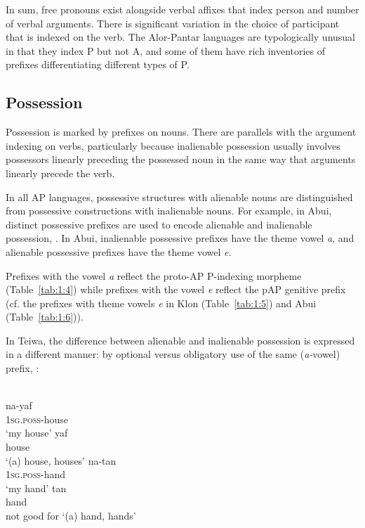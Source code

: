 In sum, free pronouns exist alongside verbal affixes that index person and number of verbal arguments. There is significant variation in the choice of participant that is indexed on the verb. The Alor-Pantar languages are typologically unusual in that they index P but not A, and some of them have rich inventories of prefixes differentiating different types of P. 

\subsection{Possession}\label{sec:1:5.3}
Possession is marked by prefixes on nouns. There are parallels with the argument indexing on verbs, particularly because inalienable possession usually involves possessors linearly preceding the possessed noun in the same way that arguments linearly precede the verb. 

In all AP languages, possessive structures with alienable nouns are distinguished from possessive constructions with inalienable nouns. For example, in Abui, distinct possessive prefixes are used to encode alienable and inalienable possession, . In Abui, inalienable possessive prefixes have the theme vowel \textit{a}, and alienable possessive prefixes have the theme vowel \textit{e.}



Prefixes with the vowel \textit{a} reflect the proto-AP P-indexing morpheme (Table~\ref{tab:1:4}) while prefixes with the vowel \textit{e} reflect the pAP genitive prefix (cf. the prefixes with theme vowels \textit{e} in Klon (Table~\ref{tab:1:5}) and Abui (Table~\ref{tab:1:6})). 

In Teiwa, the difference between alienable and inalienable possession is expressed in a different manner: by optional versus obligatory use of the same (\textit{a-}vowel) prefix, :



\ea%
\label{ex:1:23}
 \\
\ea
\gll na-yaf \\
  \textsc{1sg.poss-}house  \\
\glt `my house' 
\ex
\gll yaf \\
  house   \\
\glt    `(a) house, houses'
\ex
\gll na-tan \\
  \textsc{1sg.poss-}hand   \\
\glt `my hand' 
\ex
\gll tan \\
  hand \\
\glt  not good for `(a) hand, hands'
\z\z


